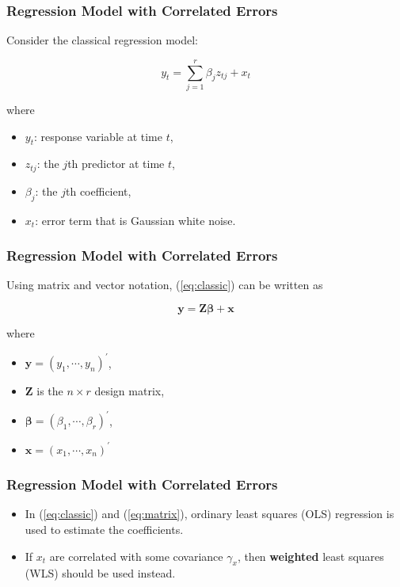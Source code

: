 \documentclass[%
xcolor=pdftex]{beamer}
\begin{document}
\begin{frame}
\frametitle{Regression Model with Correlated Errors}

Consider the classical regression model:

\begin{equation} \label{eq:classic}
y_t = \sum_{j=1}^r \beta_j z_{tj} + x_t
\end{equation}

where

\begin{itemize}
\item $y_t$: response variable at time $t$,
\item $z_{tj}$: the $j$th predictor at time $t$,
\item $\beta_j$: the $j$th coefficient,
\item $x_t$: error term that is Gaussian white noise.
\end{itemize}

\end{frame}



\begin{frame}
\frametitle{Regression Model with Correlated Errors}

Using matrix and vector notation, (\ref{eq:classic}) can be written as

\begin{equation} \label{eq:matrix}
\boldsymbol{y} = \boldsymbol{Z \beta} + \boldsymbol{x}
\end{equation}

where

\begin{itemize}
\item $\boldsymbol{y} = (y_1, \cdots, y_n)^\prime$,
\item $\boldsymbol{Z}$ is the $n \times r$ design matrix,
\item $\boldsymbol{\beta} = (\beta_1, \cdots, \beta_r)^\prime$,
\item $\boldsymbol{x} = (x_1, \cdots, x_n)^\prime$
\end{itemize}

\end{frame}

\begin{frame}
\frametitle{Regression Model with Correlated Errors}

\begin{itemize}
\item In (\ref{eq:classic}) and (\ref{eq:matrix}), ordinary least squares (OLS) regression is used to estimate the coefficients.
\item If $x_t$ are correlated with some covariance $\gamma_x$, then \textbf{weighted} least squares (WLS) should be used instead.
\end{itemize}


\end{frame}
\end{document}
